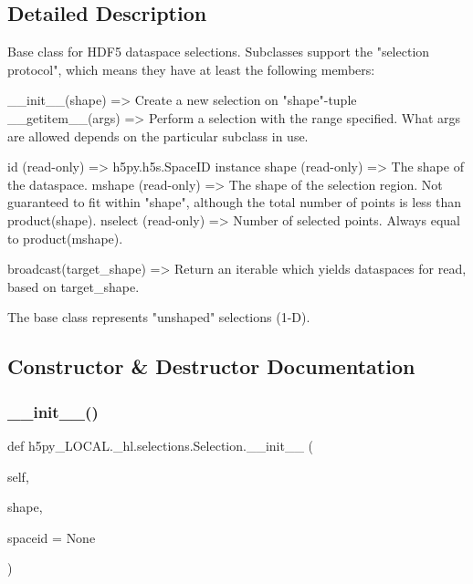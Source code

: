 \subsection{Detailed Description}
\begin{DoxyVerb}    Base class for HDF5 dataspace selections.  Subclasses support the
    "selection protocol", which means they have at least the following
    members:
    
    __init__(shape)   => Create a new selection on "shape"-tuple
    __getitem__(args) => Perform a selection with the range specified.
                         What args are allowed depends on the
                         particular subclass in use.

    id (read-only) =>      h5py.h5s.SpaceID instance
    shape (read-only) =>   The shape of the dataspace.
    mshape  (read-only) => The shape of the selection region. 
                           Not guaranteed to fit within "shape", although
                           the total number of points is less than
                           product(shape).
    nselect (read-only) => Number of selected points.  Always equal to
                           product(mshape).

    broadcast(target_shape) => Return an iterable which yields dataspaces
                               for read, based on target_shape.

    The base class represents "unshaped" selections (1-D).
\end{DoxyVerb}
 

\subsection{Constructor \& Destructor Documentation}
\mbox{\label{classh5py__LOCAL_1_1__hl_1_1selections_1_1Selection_aaa51e08873bb726131b50dd33009beda}} 
\subsubsection{\texorpdfstring{\+\_\+\+\_\+init\+\_\+\+\_\+()}{\_\_init\_\_()}}
{\footnotesize\ttfamily def h5py\+\_\+\+L\+O\+C\+A\+L.\+\_\+hl.\+selections.\+Selection.\+\_\+\+\_\+init\+\_\+\+\_\+ (\begin{DoxyParamCaption}\item[{}]{self,  }\item[{}]{shape,  }\item[{}]{spaceid = {\ttfamily None} }\end{DoxyParamCaption})}

